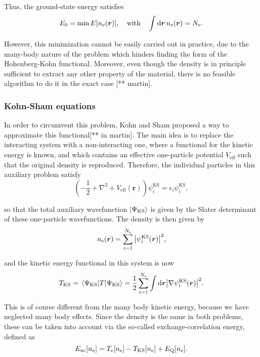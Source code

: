 Thus, the ground-state energy satisfies
\begin{equation}
E_0=\min E[n_{\mathrm e}(\bm r)],\quad \mathrm{with}\quad \int \mathrm{d}\bm r\, n_{\mathrm e}(\bm{r})=N_e.
\end{equation}

However, this minimization cannot be easily carried out in practice, due to the many-body nature of the problem which hinders finding the form of the Hohenberg-Kohn functional. Moreover, even though the density is in principle sufficient to extract any other property of the material, there is no feasible algorithm to do it in the exact case [** martin]. 

\subsubsection*{Kohn-Sham equations}
In order to circumvent this problem, Kohn and Sham proposed a way to approximate this functional[** in martin]. The main idea is to replace the interacting system with a non-interacting one, where a functional for the kinetic energy is known, and which contains an effective one-particle potential \(V_{\mathrm{eff}}\) such that the original density is reproduced. Therefore, the individual particles in this auxiliary problem satisfy
\begin{equation}
\label{ks-eq}
\left(-\frac1 2+\nabla^2+V_{\mathrm{eff}}(\bm r)\right)\psi^{\mathrm{KS}}_i=\epsilon_i \psi^{\mathrm{KS}}_i,
\end{equation}

so that the total auxiliary wavefunction \(\ket{\Psi_{\mathrm{KS}}}\) is given by the Slater determinant of these one-particle wavefunctions. The density is then given by
\begin{equation}
	n_{\mathrm{e}}(\bm r)=\sum^{N_{\mathrm e}}_{i=1}\abs{\psi_i^{\mathrm{KS}}(\bm r)}^2,
\end{equation}

and the kinetic energy functional in this system is now
\begin{equation}
T_{\mathrm{KS}}=\expval{T}{\Psi_{\mathrm{KS}}}=\frac1 2\sum_{i=1}^{N_{\mathrm e}}\int\mathrm{d}\bm r\abs{\nabla\psi_i^{\mathrm{KS}}(\bm r)}^2.
\end{equation}

This is of course different from the many body kinetic energy, because we have neglected many body effects. Since the density is the same in both problems, these can be taken into account via the so-called exchange-correlation energy, defined as
\begin{equation}
E_{\mathrm{xc}}[n_{\mathrm{e}}]=T_{\mathrm{e}}[n_{\mathrm{e}}]-T_{\mathrm{KS}}[n_{\mathrm{e}}]+E_{\mathrm{Q}}[n_{\mathrm{e}}].
\end{equation}


